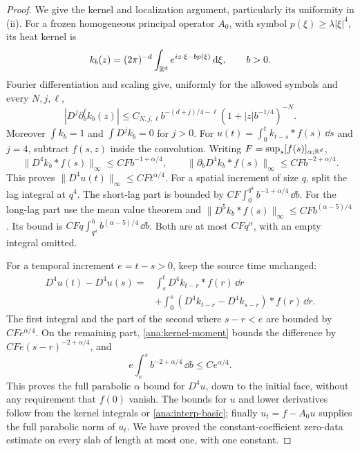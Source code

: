 \begin{proof}
We give the kernel and localization argument, particularly its
uniformity in \textup{(ii)}.  For a frozen homogeneous principal
operator $A_0$, with symbol $p(\xi)\ge\lambda|\xi|^4$, its heat kernel is
\[
 k_b(z)=(2\pi)^{-d}\int_{\mathbb{R}^d}e^{iz\cdot\xi-bp(\xi)}\,\mathrm{d}\xi,
 \qquad b>0.
\]
Fourier differentiation and scaling give, uniformly for the allowed
symbols and every $N,j,\ell$,
\begin{equation}\label{ana:kernel}
 |D^j\partial_b^\ell k_b(z)|
 \le C_{N,j,\ell}b^{-(d+j)/4-\ell}
                  (1+|z|b^{-1/4})^{-N}.
\end{equation}
Moreover $\int k_b=1$ and $\int D^jk_b=0$ for $j>0$.  For
$u(t)=\int_0^tk_{t-s}*f(s)\,\dd s$ and $j=4$, subtract $f(s,z)$
inside the convolution.  Writing $F=\sup_s[f(s)]_{\alpha;\mathbb{R}^d}$,
\begin{equation}\label{ana:kernel-moment}
 \|D^4k_b*f(s)\|_\infty\le CF b^{-1+\alpha/4},\qquad
 \|\partial_bD^4k_b*f(s)\|_\infty
                    \le CF b^{-2+\alpha/4}.
\end{equation}
This proves $\|D^4u(t)\|_\infty\le CFt^{\alpha/4}$.
For a spatial increment of size $q$, split the lag integral at $q^4$.
The short-lag part is bounded by
$CF\int_0^{q^4}b^{-1+\alpha/4}\,\dd b$.
For the long-lag part use the mean value theorem and
$\|D^5k_b*f(s)\|_\infty\le CFb^{(\alpha-5)/4}$.
Its bound is $CFq\int_{q^4}^h b^{(\alpha-5)/4}\,\dd b$.
Both are at most $CFq^\alpha$, with an empty integral omitted.

For a temporal increment $e=t-s>0$, keep the source time unchanged:
\begin{align*}
 D^4u(t)-D^4u(s)
 ={}&\int_s^tD^4k_{t-r}*f(r)\,\dd r\\
 &+\int_0^s(D^4k_{t-r}-D^4k_{s-r})*f(r)\,\dd r.
\end{align*}
The first integral and the part of the second where $s-r<e$ are
bounded by $CF e^{\alpha/4}$.  On the remaining part,
\eqref{ana:kernel-moment} bounds the difference by
$CF e(s-r)^{-2+\alpha/4}$, and
\[
 e\int_e^s b^{-2+\alpha/4}\,\dd b\le C e^{\alpha/4}.
\]
This proves the full parabolic $\alpha$ bound for $D^4u$, down to
the initial face, without any requirement that $f(0)$ vanish.
The bounds for $u$ and lower derivatives follow from the kernel
integrals or \eqref{ana:interp-basic}; finally
$u_t=f-A_0u$ supplies the full parabolic norm of $u_t$.
We have proved the constant-coefficient zero-data estimate on every
slab of length at most one, with one constant.


\end{proof}
